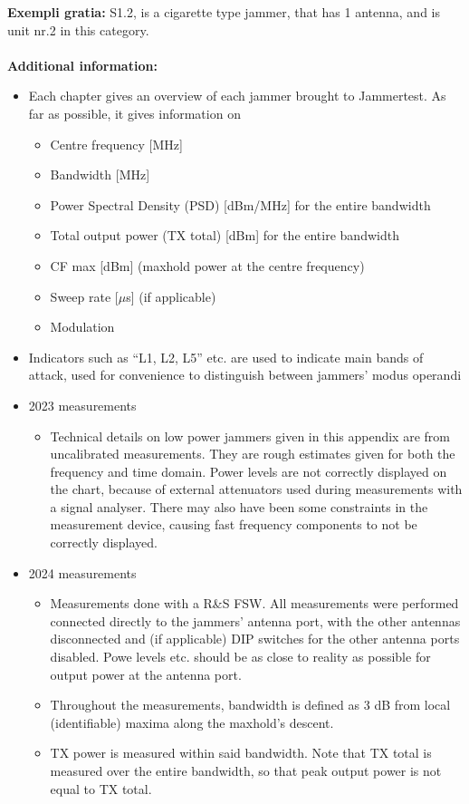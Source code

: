 \documentclass[a4paper]{book}
\begin{document}
\textbf{Exempli gratia:}
S1.2, is a cigarette type jammer, that has 1 antenna, and is unit nr.2 in this category.
\\
\\
\textbf{Additional information:}
\begin{itemize}
    \item Each chapter gives an overview of each jammer brought to Jammertest. As far as possible, it
gives information on
    \begin{itemize}
        \item Centre frequency [MHz]
        \item Bandwidth [MHz]
        \item Power Spectral Density (PSD) [dBm/MHz] for the entire bandwidth
        \item Total output power (TX total) [dBm] for the entire bandwidth
        \item CF max [dBm] (maxhold power at the centre frequency)
        \item Sweep rate [$\mu$s] (if applicable)
        \item Modulation
    \end{itemize}
    \item Indicators such as “L1, L2, L5” etc. are used to indicate main bands of attack, used for
convenience to distinguish between jammers' modus operandi
\item 2023 measurements
    \begin{itemize}
        \item Technical details on low power jammers given in this appendix are from uncalibrated
        measurements. They are rough estimates given for both the frequency and time
        domain. Power levels are not correctly displayed on the chart, because of external
        attenuators used during measurements with a signal analyser. There may also have
        been some constraints in the measurement device, causing fast frequency
        components to not be correctly displayed.
    \end{itemize}
    \item 2024 measurements
    \begin{itemize}
        \item Measurements done with a R\&S FSW. All measurements were performed connected
        directly to the jammers' antenna port, with the other antennas disconnected and (if
        applicable) DIP switches for the other antenna ports disabled. Powe levels etc. should
        be as close to reality as possible for output power at the antenna port.
        \item Throughout the measurements, bandwidth is defined as 3 dB from local (identifiable)
        maxima along the maxhold's descent.
        \item TX power is measured within said bandwidth. Note that TX total is measured over the
        entire bandwidth, so that peak output power is not equal to TX total.
    \end{itemize}
\end{itemize}
\end{document}
